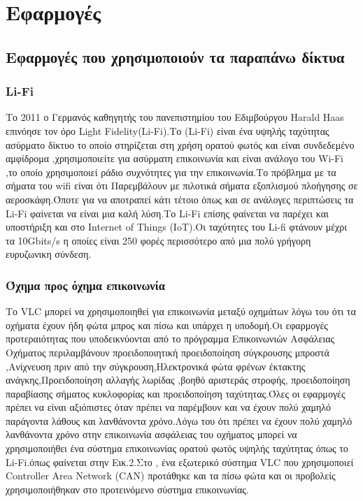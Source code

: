 \documentclass[conference]{IEEEtran}
\begin{document}
\section{Εφαρμογές}


\subsection{Εφαρμογές που χρησιμοποιούν τα παραπάνω δίκτυα \cite{b1}}

\subsubsection{Li-Fi}
Το 2011 ο Γερμανός καθηγητής του πανεπιστημίου του Εδιμβούργου Harald Haas επινόησε τον όρο Light Fidelity(Li-Fi).Το (Li-Fi) είναι ένα υψηλής ταχύτητας ασύρματο δίκτυο το οποίο στηρίζεται στη χρήση ορατού φωτός και είναι συνδεδεμένο  αμφίδρομα ,χρησιμοποιείτε για  ασύρματη επικοινωνία  και είναι ανάλογο του Wi-Fi ,το οποίο χρησιμοποιεί  ράδιο συχνότητες για την επικοινωνία.Το πρόβλημα  με τα σήματα του wifi είναι ότι Παρεμβάλουν με πιλοτικά σήματα εξοπλισμού πλοήγησης σε αεροσκάφη.Όποτε για να αποτραπεί κάτι τέτοιο όπως και σε ανάλογες περιπτώσεις  τα Li-Fi φαίνεται να είναι μια καλή λύση.Το Li-Fi επίσης φαίνεται να παρέχει και υποστήριξη και στο Internet of Things (IoT).Οι ταχύτητες του Li-fi φτάνουν μέχρι τα 10Gbits/s η οποίες είναι 250 φορές περισσότερο από  μια πολύ γρήγορη ευρυζωνικη σύνδεση.

\subsubsection{Όχημα προς όχημα επικοινωνία}
Το VLC μπορεί να χρησιμοποιηθεί για επικοινωνία μεταξύ οχημάτων λόγω του ότι τα οχήματα έχουν ήδη φώτα μπρος και πίσω και υπάρχει η υποδομή.Οι εφαρμογές προτεραιότητας που υποδεικνύονται από το πρόγραμμα Επικοινωνιών Ασφάλειας Οχήματος περιλαμβάνουν προειδοποιητική προειδοποίηση σύγκρουσης μπροστά ,Ανίχνευση πριν από την σύγκρουση,Ηλεκτρονικά φώτα φρένων έκτακτης ανάγκης,Προειδοποίηση αλλαγής λωρίδας ,βοηθό αριστεράς στροφής, προειδοποίηση παραβίασης σήματος κυκλοφορίας και προειδοποίηση ταχύτητας.Όλες οι εφαρμογές πρέπει να είναι αξιόπιστες όταν πρέπει να παρέμβουν και να έχουν πολύ χαμηλό παράγοντα λάθους και λανθάνοντα χρόνο.Λόγω του ότι πρέπει να  έχουν πολύ χαμηλό λανθάνοντα χρόνο  στην επικοινωνία ασφάλειας του οχήματος  μπορεί να χρησιμοποιήθει  ένα σύστημα  επικοινωνίας  ορατού φωτός  υψηλής ταχύτητας όπως το Li-Fi.όπως φαίνεται στην Εικ.2.Στο \cite{b4}, ένα εξωτερικό σύστημα VLC που χρησιμοποιεί Controller Area Network (CAN) προτάθηκε και τα πίσω φώτα και οι προβολείς χρησιμοποιήθηκαν στο προτεινόμενο σύστημα επικοινωνίας.
\end{document}
